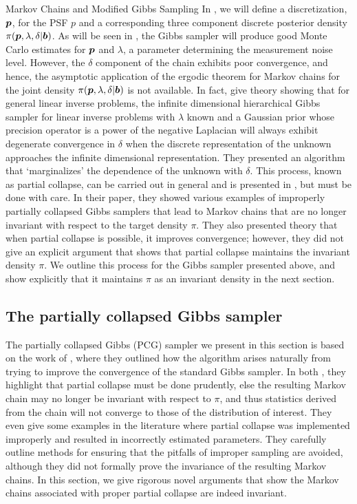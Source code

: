 \begin{chapter}{Markov Chains and Modified Gibbs Sampling}
In , we will define a discretization, $\mbox{\boldmath$p$}$, for the PSF $p$ and a corresponding three component discrete posterior density $\pi(\mbox{\boldmath$p$},\lambda,\delta|\mbox{\boldmath$b$})$.
As will be seen in , the Gibbs sampler will produce good Monte Carlo estimates for $\mbox{\boldmath$p$}$ and  $\lambda$, a parameter determining the measurement noise level. 
However, the $\delta$ component of the chain exhibits poor convergence, and hence, the asymptotic application of the ergodic theorem for Markov chains for the joint density $\pi(\mbox{\boldmath$p$},\lambda,\delta|\mbox{\boldmath$b$})$ is not available.
In fact, \citep{agapiou2014analysis} give theory showing that for general linear inverse problems, the infinite dimensional hierarchical Gibbs sampler for linear inverse problems with $\lambda$ known and a Gaussian prior whose precision operator is a power of the negative Laplacian will always exhibit degenerate convergence in $\delta$ when the discrete representation of the unknown approaches the infinite dimensional representation.
They presented an algorithm that `marginalizes' the dependence of the unknown with $\delta$.
This process, known as partial collapse, can be carried out in general and is presented in \citep{van2008partially}, but must be done with care.
In their paper, they showed various examples of improperly partially collapsed Gibbs samplers that lead to Markov chains that are no longer invariant with respect to the target density $\pi$.
They also presented theory that when partial collapse is possible, it improves convergence; however, they did not give an explicit argument that shows that partial collapse maintains the invariant density $\pi$.
We outline this process for the Gibbs sampler presented above, and show explicitly that it maintains $\pi$ as an invariant density in the next section.

\subsection{The partially collapsed Gibbs sampler}
The partially collapsed Gibbs (PCG) sampler we present in this section is based on the work of \citep{van2008partially,van2015metropolis}, where they outlined how the algorithm arises naturally from trying to improve the convergence of the standard Gibbs sampler.
In both \citep{van2008partially,van2015metropolis}, they highlight that partial collapse must be done prudently, else the resulting Markov chain may no longer be invariant with respect to $\pi$, and thus statistics derived from the chain will not converge to those of the distribution of interest.
They even give some examples in the literature where partial collapse was implemented improperly and resulted in incorrectly estimated parameters.
They carefully outline methods for ensuring that the pitfalls of improper sampling are avoided, although they did not formally prove the invariance of the resulting Markov chains.
In this section, we give rigorous novel arguments that show the Markov chains associated with proper partial collapse are indeed invariant.


\end{chapter}

